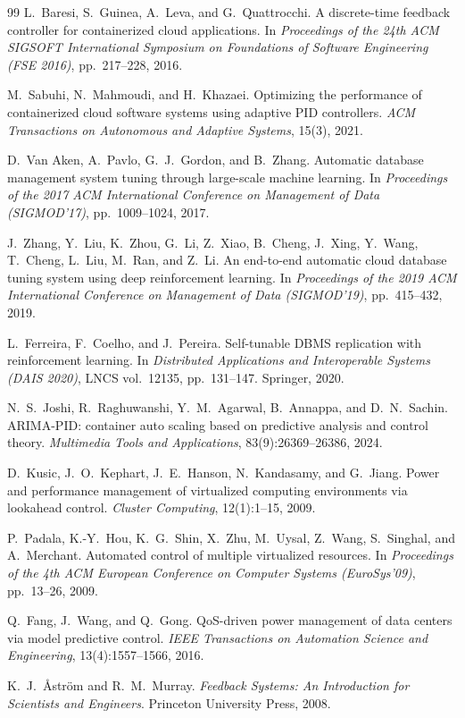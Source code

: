 \documentclass[journal]{IEEEtran}
\begin{document}
\begin{thebibliography}{99}
L.\ Baresi, S.\ Guinea, A.\ Leva, and G.\ Quattrocchi.
\newblock A discrete-time feedback controller for containerized cloud
  applications.
\newblock In \emph{Proceedings of the 24th ACM SIGSOFT International
  Symposium on Foundations of Software Engineering (FSE 2016)}, pp.\
  217--228, 2016.

M.\ Sabuhi, N.\ Mahmoudi, and H.\ Khazaei.
\newblock Optimizing the performance of containerized cloud software
  systems using adaptive PID controllers.
\newblock \emph{ACM Transactions on Autonomous and Adaptive Systems},
  15(3), 2021.

D.\ Van Aken, A.\ Pavlo, G.\ J.\ Gordon, and B.\ Zhang.
\newblock Automatic database management system tuning through
  large-scale machine learning.
\newblock In \emph{Proceedings of the 2017 ACM International
  Conference on Management of Data (SIGMOD'17)}, pp.\ 1009--1024, 2017.

J.\ Zhang, Y.\ Liu, K.\ Zhou, G.\ Li, Z.\ Xiao, B.\ Cheng, J.\ Xing,
  Y.\ Wang, T.\ Cheng, L.\ Liu, M.\ Ran, and Z.\ Li.
\newblock An end-to-end automatic cloud database tuning system using
  deep reinforcement learning.
\newblock In \emph{Proceedings of the 2019 ACM International
  Conference on Management of Data (SIGMOD'19)}, pp.\ 415--432, 2019.

L.\ Ferreira, F.\ Coelho, and J.\ Pereira.
\newblock Self-tunable DBMS replication with reinforcement learning.
\newblock In \emph{Distributed Applications and Interoperable Systems
  (DAIS 2020)}, LNCS vol.\ 12135, pp.\ 131--147. Springer, 2020.

N.\ S.\ Joshi, R.\ Raghuwanshi, Y.\ M.\ Agarwal, B.\ Annappa, and
  D.\ N.\ Sachin.
\newblock ARIMA-PID: container auto scaling based on predictive
  analysis and control theory.
\newblock \emph{Multimedia Tools and Applications}, 83(9):26369--26386,
  2024.

D.\ Kusic, J.\ O.\ Kephart, J.\ E.\ Hanson, N.\ Kandasamy, and G.\ Jiang.
\newblock Power and performance management of virtualized computing
  environments via lookahead control.
\newblock \emph{Cluster Computing}, 12(1):1--15, 2009.

P.\ Padala, K.-Y.\ Hou, K.\ G.\ Shin, X.\ Zhu, M.\ Uysal, Z.\ Wang,
  S.\ Singhal, and A.\ Merchant.
\newblock Automated control of multiple virtualized resources.
\newblock In \emph{Proceedings of the 4th ACM European Conference on
  Computer Systems (EuroSys'09)}, pp.\ 13--26, 2009.

Q.\ Fang, J.\ Wang, and Q.\ Gong.
\newblock QoS-driven power management of data centers via model
  predictive control.
\newblock \emph{IEEE Transactions on Automation Science and
  Engineering}, 13(4):1557--1566, 2016.

K.\ J.\ {\AA}str\"om and R.\ M.\ Murray.
\newblock \emph{Feedback Systems: An Introduction for Scientists and
  Engineers}.
\newblock Princeton University Press, 2008.
\end{thebibliography}
\end{document}
